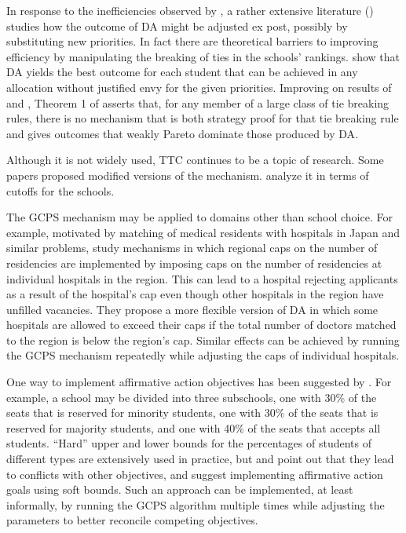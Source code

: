 \documentclass[12pt, A4paper]{article}
\theoremstyle{definition}
\begin{document}
In response to the inefficiencies observed by \cite{apr09aer}, a rather extensive literature (\citealp{ee08aer,kesten10qje,TaYu14,ku15te}) studies how the outcome of DA might be adjusted ex post, possibly by substituting new priorities.  In fact there are theoretical barriers to improving efficiency by manipulating the breaking of ties in the schools' rankings.  \cite{GaSh62} show that DA yields the best outcome for each student that can be achieved in any allocation without justified envy for the given priorities.   Improving on results of \cite{kesten06jet} and \cite{ee08aer}, Theorem 1 of \cite{apr09aer} asserts that, for any member of a large class of tie breaking rules, there is no mechanism that is both strategy proof for that tie breaking rule and gives outcomes that weakly Pareto dominate those produced by DA. 

Although it is not widely used, TTC continues to be a topic of research.  Some papers \citep{Mor15,HaKe18,Gri23} proposed modified versions of the mechanism.  \cite{LeLo20} analyze it in terms of cutoffs for the schools.

The GCPS mechanism may be applied to domains other than school choice.  For example, motivated by matching of medical residents with hospitals in Japan and similar problems, \cite{KaKo15,KaKo17} study mechanisms in which regional caps on the number of residencies are implemented by imposing caps on the number of residencies at individual hospitals in the region.   This can lead to a hospital rejecting applicants as a result of the hospital's cap even though other hospitals in the region have unfilled vacancies.  They propose a more flexible version of DA in which some hospitals are allowed to exceed their caps if the total number of doctors matched to the region is below the region's cap.  Similar effects can be achieved by running the GCPS mechanism repeatedly while adjusting the caps of individual hospitals.  

One way to implement affirmative action objectives has been suggested by \cite{as03aer}.  For example, a school may be divided into three subschools, one with 30\% of the seats that is reserved for minority students, one with 30\% of the seats that is reserved for majority students, and one with 40\% of the seats that accepts all students. ``Hard'' upper and lower bounds for the percentages of students of different types are extensively used in practice, but \cite{Koj12} and \cite{HaYeYi13} point out that they lead to conflicts with other objectives, and \cite{EHYY14} suggest implementing affirmative action goals using soft bounds.  Such an approach can be implemented, at least informally, by running the GCPS algorithm multiple times while adjusting the parameters to better reconcile competing objectives. 
\end{document}
